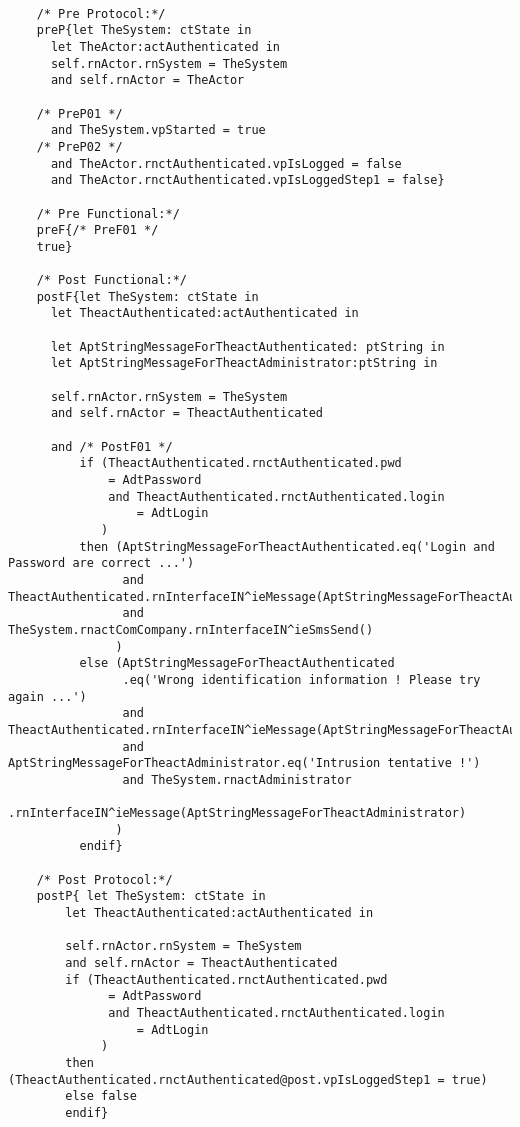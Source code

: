 	\scriptsize
	\vspace{0.5cm}
	\begin{lstlisting}[style=MessirStyle,firstnumber=auto,captionpos=b,caption={\msrmessir (MCL-oriented) specification of the operation \emph{oeLogin}.},label=OM-actAuthenticated-oeLogin-MCL-LST]

	/* Pre Protocol:*/ 
	preP{let TheSystem: ctState in
	  let TheActor:actAuthenticated in
	  self.rnActor.rnSystem = TheSystem
	  and self.rnActor = TheActor
	  
	/* PreP01 */
	  and TheSystem.vpStarted = true
	/* PreP02 */
	  and TheActor.rnctAuthenticated.vpIsLogged = false
	  and TheActor.rnctAuthenticated.vpIsLoggedStep1 = false}
	
	/* Pre Functional:*/
	preF{/* PreF01 */
	true}
	
	/* Post Functional:*/ 
	postF{let TheSystem: ctState in
	  let TheactAuthenticated:actAuthenticated in
	
	  let AptStringMessageForTheactAuthenticated: ptString in
	  let AptStringMessageForTheactAdministrator:ptString in
	  
	  self.rnActor.rnSystem = TheSystem
	  and self.rnActor = TheactAuthenticated
	  
	  and /* PostF01 */
	      if (TheactAuthenticated.rnctAuthenticated.pwd
	          = AdtPassword
	          and TheactAuthenticated.rnctAuthenticated.login
	              = AdtLogin
	         )
	      then (AptStringMessageForTheactAuthenticated.eq('Login and Password are correct ...')
	            and TheactAuthenticated.rnInterfaceIN^ieMessage(AptStringMessageForTheactAuthenticated)
	            and TheSystem.rnactComCompany.rnInterfaceIN^ieSmsSend()
	           )
	      else (AptStringMessageForTheactAuthenticated
	            .eq('Wrong identification information ! Please try again ...')
	            and TheactAuthenticated.rnInterfaceIN^ieMessage(AptStringMessageForTheactAuthenticated)
	            and AptStringMessageForTheactAdministrator.eq('Intrusion tentative !')
	            and TheSystem.rnactAdministrator
	                .rnInterfaceIN^ieMessage(AptStringMessageForTheactAdministrator)
	           )
	      endif}
	
	/* Post Protocol:*/ 
	postP{ let TheSystem: ctState in
	  	let TheactAuthenticated:actAuthenticated in
	
	  	self.rnActor.rnSystem = TheSystem
	  	and self.rnActor = TheactAuthenticated
		if (TheactAuthenticated.rnctAuthenticated.pwd
	          = AdtPassword
	          and TheactAuthenticated.rnctAuthenticated.login
	              = AdtLogin
	         )
	 	then (TheactAuthenticated.rnctAuthenticated@post.vpIsLoggedStep1 = true)
	 	else false
	 	endif}
	
	\end{lstlisting}
	\normalsize 
	
